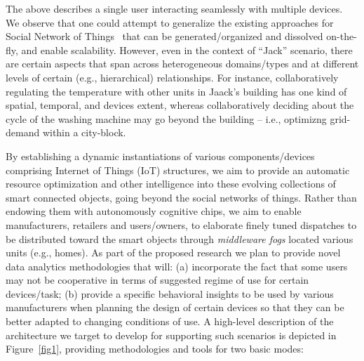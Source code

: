 
The above describes a single user interacting seamlessly with multiple devices. We observe that one could attempt to generalize the existing approaches for Social Network of Things~\cite{IeraMA15,NittiPCA16} that can be generated/organized and dissolved on-the-fly, and enable scalability.
However, even in the context of ``Jack'' scenario, there are certain aspects that span across heterogeneous domains/types and at different levels of certain (e.g., hierarchical) relationships. For instance, collaboratively regulating the temperature with other units in Jaack’s building has one kind of spatial, temporal, and devices extent, whereas collaboratively deciding about the cycle of the washing machine may go beyond the building -- i.e., optimizng grid-demand within a city-block.

By establishing a dynamic instantiations of various components/devices comprising Internet of Things (IoT) structures, we aim to  provide an automatic resource optimization and other intelligence into these evolving collections of smart connected objects, going beyond the social networks of things. Rather than endowing them with autonomously cognitive chips, we aim to enable manufacturers, retailers and users/owners, to elaborate finely tuned dispatches to be distributed toward the smart objects through {\it middleware fogs} located various units (e.g., homes).
As part of the proposed research we plan to provide novel data analytics methodologies that will: (a) incorporate the fact that some users may not be cooperative in terms of suggested regime of use for certain devices/task; (b) provide a specific behavioral insights to be used by various manufacturers when planning the design of certain devices so that they can be better adapted to changing conditions of use.
 A high-level description of the architecture we target to develop for supporting such  scenarios is depicted in Figure~\ref{fig1}, providing methodologies and tools for two basic modes: \\

